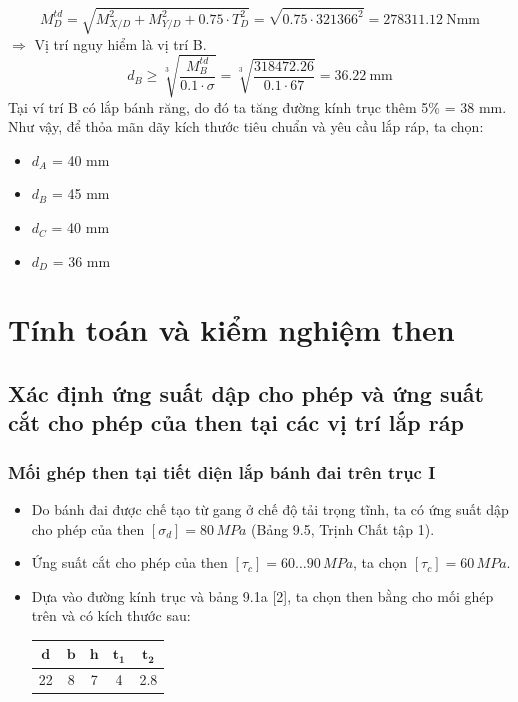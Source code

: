 \[
    M_D^{td} 
    = \sqrt{M_{X/D}^2 + M_{Y/D}^2 + 0.75 \cdot T_D^2} 
    = \sqrt{0.75 \cdot 321366^2} 
    = 278311.12\ \text{Nmm}
\]
$\Rightarrow$ Vị trí nguy hiểm là vị trí B.
\[
    d_B \ge \sqrt[3]{\frac{M_B^{td}}{0.1 \cdot \sigma}} 
        = \sqrt[3]{\frac{318472.26}{0.1 \cdot 67}} 
        = 36.22\ \text{mm}
\]
Tại ví trí B có lắp bánh răng, do đó ta tăng đường kính trục thêm 5\% = 38 mm. \\
Như vậy, để thỏa mãn dãy kích thước tiêu chuẩn và yêu cầu lắp ráp, ta chọn:
\begin{itemize}
    \item $d_A$ = 40 mm
    \item $d_B$ = 45 mm     
    \item $d_C$ = 40 mm
    \item $d_D$ = 36 mm
\end{itemize}

\section{Tính toán và kiểm nghiệm then}
\subsection{Xác định ứng suất dập cho phép và ứng suất cắt cho phép của then tại các vị trí lắp ráp}
\subsubsection{Mối ghép then tại tiết diện lắp bánh đai trên trục I}
\begin{itemize}
    \item Do bánh đai được chế tạo từ gang ở chế độ tải trọng tĩnh, ta có ứng suất dập cho phép của then $[\sigma_d] = 80 \, MPa$ (Bảng 9.5, Trịnh Chất tập 1).
    \item Ứng suất cắt cho phép của then $[\tau_c] = 60 \dots 90 \, MPa$, ta chọn $[\tau_c] = 60 \, MPa$.
    \item Dựa vào đường kính trục và bảng 9.1a [2], ta chọn then bằng cho mối ghép trên và có kích thước sau:
    \begin{table}[h!]
    \centering
    \begin{tabular}{|c|c|c|c|c|}
    \hline
    $\mathbf{d}$ & $\mathbf{b}$ & $\mathbf{h}$ & $\mathbf{t_1}$ & $\mathbf{t_2}$ \\
    \hline
    22 & 8 & 7 & 4 & 2.8 \\
    \hline
    \end{tabular}
    \end{table}
\end{itemize}
